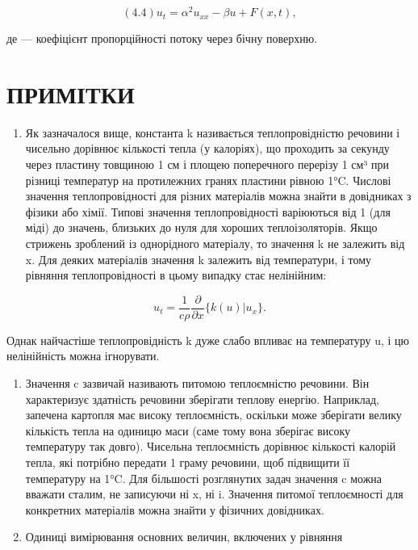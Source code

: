 \documentclass[
  ukrainian,
]{article}
\providecommand{\tightlist}{%
  \setlength{\itemsep}{0pt}\setlength{\parskip}{0pt}}
\begin{document}
\[
(4.4) u_t = \alpha^2 u_{xx} - \beta u + F(x, t),
\]

де \beta --- коефіцієнт пропорційності потоку через бічну поверхню.

\section{ПРИМІТКИ}\label{ux43fux440ux438ux43cux456ux442ux43aux438}

\begin{enumerate}
\def\labelenumi{\arabic{enumi}.}
\tightlist
\item
  Як зазначалося вище, константа k називається теплопровідністю речовини
  і чисельно дорівнює кількості тепла (у калоріях), що проходить за
  секунду через пластину товщиною 1 см і площею поперечного перерізу 1
  см³ при різниці температур на протилежних гранях пластини рівною 1°C.
  Числові значення теплопровідності для різних матеріалів можна знайти в
  довідниках з фізики або хімії. Типові значення теплопровідності
  варіюються від 1 (для міді) до значень, близьких до нуля для хороших
  теплоізоляторів. Якщо стрижень зроблений із однорідного матеріалу, то
  значення k не залежить від x. Для деяких матеріалів значення k
  залежить від температури, і тому рівняння теплопровідності в цьому
  випадку стає нелінійним:
\end{enumerate}

\[
u_{t} = \frac{1}{c\rho} \frac{\partial}{\partial x} \{ k (u) | u_{x} \}.
\]

Однак найчастіше теплопровідність k дуже слабо впливає на температуру u,
і цю нелінійність можна ігнорувати.

\begin{enumerate}
\def\labelenumi{\arabic{enumi}.}
\setcounter{enumi}{1}
\item
  Значення c зазвичай називають питомою теплоємністю речовини. Він
  характеризує здатність речовини зберігати теплову енергію. Наприклад,
  запечена картопля має високу теплоємність, оскільки може зберігати
  велику кількість тепла на одиницю маси (саме тому вона зберігає високу
  температуру так довго). Чисельна теплоємність дорівнює кількості
  калорій тепла, які потрібно передати 1 граму речовини, щоб підвищити
  її температуру на 1°C. Для більшості розглянутих задач значення c
  можна вважати сталим, не записуючи ні x, ні i. Значення питомої
  теплоємності для конкретних матеріалів можна знайти у фізичних
  довідниках.
\item
  Одиниці вимірювання основних величин, включених у рівняння
\end{enumerate}
\end{document}

